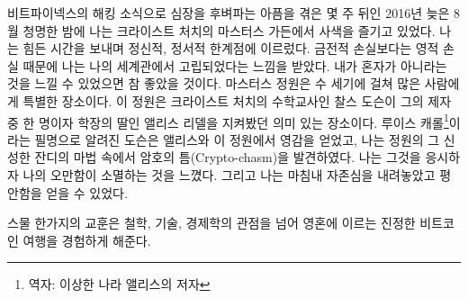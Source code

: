 
비트파이넥스의 해킹 소식으로 심장을 후벼파는 아픔을 겪은 몇 주 뒤인 2016년 늦은 8월 청명한 밤에 나는
크라이스트 처치의 마스터스 가든에서 사색을 즐기고 있었다. 
나는 힘든 시간을 보내며 정신적, 정서적 한계점에 이르렀다.
금전적 손실보다는 영적 손실 때문에 나는 나의 세계관에서 고립되었다는 느낌을 받았다. 
내가 혼자가 아니라는 것을 느낄 수 있었으면 참 좋았을 것이다. 
마스터스 정원은 수 세기에 걸쳐 많은 사람에게 특별한 장소이다.
이 정원은 크라이스트 처치의 수학교사인 찰스 도슨이 그의 제자 중 한 명이자 학장의 딸인 앨리스 리델을 지켜봤던 의미 있는 장소이다.
루이스 캐롤\footnote{역자: 이상한 나라 앨리스의 저자}이라는 필명으로 알려진 도슨은 앨리스와 이 정원에서 영감을 얻었고, 
나는 정원의 그 신성한 잔디의 마법 속에서 암호의 틈(Crypto-chasm)을 발견하였다.
나는 그것을 응시하자 나의 오만함이 소멸하는 것을 느꼈다. 
그리고 나는 마침내 자존심을 내려놓았고 평안함을 얻을 수 있었다. 

스물 한가지의 교훈은 철학, 기술, 경제학의 관점을 넘어 영혼에 이르는 진정한 비트코인 여행을 경험하게 해준다.


